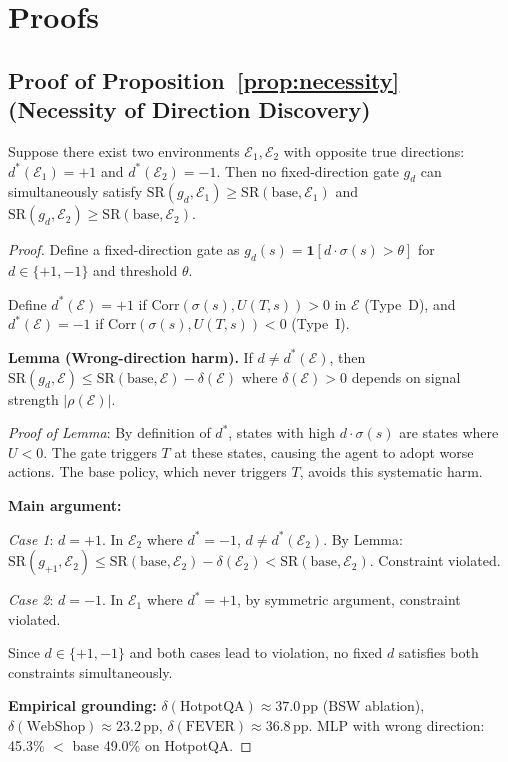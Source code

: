 \section{Proofs}
\label{app:proofs}

\subsection{Proof of Proposition~\ref{prop:necessity}
  (Necessity of Direction Discovery)}

\begin{proposition*}[Restated]
Suppose there exist two environments $\mathcal{E}_1, \mathcal{E}_2$
with opposite true directions: $d^*(\mathcal{E}_1) = +1$ and
$d^*(\mathcal{E}_2) = -1$. Then no fixed-direction gate $g_d$ can
simultaneously satisfy
$\mathrm{SR}(g_d, \mathcal{E}_1) \geq \mathrm{SR}(\mathrm{base},
\mathcal{E}_1)$ and
$\mathrm{SR}(g_d, \mathcal{E}_2) \geq \mathrm{SR}(\mathrm{base},
\mathcal{E}_2)$.
\end{proposition*}

\begin{proof}
Define a fixed-direction gate as $g_d(s) = \mathbf{1}[d \cdot \sigma(s) > \theta]$
for $d \in \{+1, -1\}$ and threshold $\theta$.

Define $d^*(\mathcal{E}) = +1$ if $\mathrm{Corr}(\sigma(s), U(T,s)) > 0$
in $\mathcal{E}$ (Type~D), and $d^*(\mathcal{E}) = -1$ if
$\mathrm{Corr}(\sigma(s), U(T,s)) < 0$ (Type~I).

\textbf{Lemma (Wrong-direction harm).} If $d \neq d^*(\mathcal{E})$, then
$\mathrm{SR}(g_d, \mathcal{E}) \leq \mathrm{SR}(\mathrm{base}, \mathcal{E}) - \delta(\mathcal{E})$
where $\delta(\mathcal{E}) > 0$ depends on signal strength $|\rho(\mathcal{E})|$.

\emph{Proof of Lemma}: By definition of $d^*$, states with high
$d \cdot \sigma(s)$ are states where $U < 0$. The gate triggers $T$
at these states, causing the agent to adopt worse actions. The base
policy, which never triggers $T$, avoids this systematic harm.

\textbf{Main argument:}

\emph{Case 1}: $d = +1$. In $\mathcal{E}_2$ where $d^* = -1$,
$d \neq d^*(\mathcal{E}_2)$. By Lemma:
$\mathrm{SR}(g_{+1}, \mathcal{E}_2) \leq \mathrm{SR}(\mathrm{base}, \mathcal{E}_2) - \delta(\mathcal{E}_2)
< \mathrm{SR}(\mathrm{base}, \mathcal{E}_2)$.
Constraint violated.

\emph{Case 2}: $d = -1$. In $\mathcal{E}_1$ where $d^* = +1$,
by symmetric argument, constraint violated.

Since $d \in \{+1, -1\}$ and both cases lead to violation, no fixed
$d$ satisfies both constraints simultaneously.

\textbf{Empirical grounding:}
$\delta(\text{HotpotQA}) \approx 37.0$\,pp (BSW ablation),
$\delta(\text{WebShop}) \approx 23.2$\,pp,
$\delta(\text{FEVER}) \approx 36.8$\,pp.
MLP with wrong direction: 45.3\% $<$ base 49.0\% on HotpotQA.
\end{proof}

